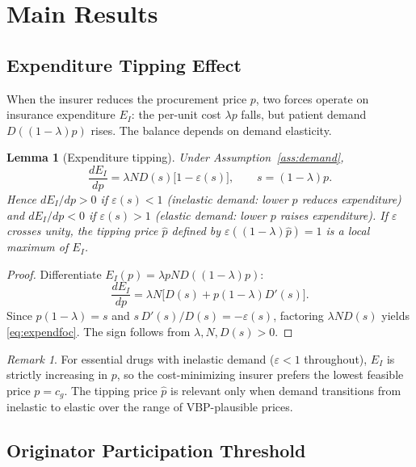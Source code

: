 \documentclass[12pt]{article}
\theoremstyle{plain}
\newtheorem{lemma}{Lemma}
\theoremstyle{definition}
\theoremstyle{remark}
\newtheorem{remark}{Remark}
\newcommand{\EI}{E_{I}}
\newcommand{\1}{\mathbf{1}}
\begin{document}
\section{Main Results}
\label{sec:results}

\subsection{Expenditure Tipping Effect}

When the insurer reduces the procurement price $p$, two forces operate on insurance expenditure $\EI$: the per-unit cost $\lambda p$ falls, but patient demand $D((1-\lambda)p)$ rises. The balance depends on demand elasticity.

\begin{lemma}[Expenditure tipping]
\label{lem:expenditure}
Under Assumption~\ref{ass:demand},
\begin{equation}
\frac{d\EI}{dp} = \lambda N D(s)\bigl[1 - \varepsilon(s)\bigr], \qquad s = (1-\lambda)p.
\label{eq:expendfoc}
\end{equation}
Hence $d\EI/dp > 0$ if $\varepsilon(s) < 1$ (inelastic demand: lower $p$ reduces expenditure) and $d\EI/dp < 0$ if $\varepsilon(s) > 1$ (elastic demand: lower $p$ raises expenditure). If $\varepsilon$ crosses unity, the \emph{tipping price} $\hat{p}$ defined by $\varepsilon((1-\lambda)\hat{p}) = 1$ is a local maximum of $\EI$.
\end{lemma}

\begin{proof}
Differentiate $\EI(p) = \lambda p N D((1-\lambda)p)$:
$$\frac{d\EI}{dp} = \lambda N\bigl[D(s) + p(1-\lambda)D'(s)\bigr].$$
Since $p(1-\lambda) = s$ and $s\,D'(s)/D(s) = -\varepsilon(s)$, factoring $\lambda N D(s)$ yields \eqref{eq:expendfoc}. The sign follows from $\lambda, N, D(s) > 0$.
\end{proof}

\begin{remark}
For essential drugs with inelastic demand ($\varepsilon < 1$ throughout), $\EI$ is strictly increasing in $p$, so the cost-minimizing insurer prefers the lowest feasible price $p = c_g$. The tipping price $\hat{p}$ is relevant only when demand transitions from inelastic to elastic over the range of VBP-plausible prices.
\end{remark}

\subsection{Originator Participation Threshold}
\end{document}
